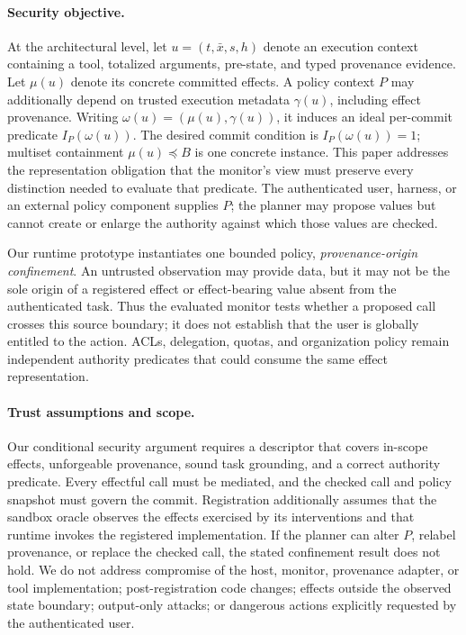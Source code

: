\documentclass[letterpaper,twocolumn,10pt]{article}
\theoremstyle{definition}
\begin{document}
\paragraph{Security objective.}
At the architectural level, let $u=(t,\bar{x},s,h)$ denote an execution context
containing a tool, totalized arguments, pre-state, and typed provenance evidence.
Let $\mu(u)$ denote its concrete committed effects.  A policy context $P$
may additionally depend on trusted execution metadata $\gamma(u)$, including
effect provenance.  Writing $\omega(u)=(\mu(u),\gamma(u))$, it induces an ideal
per-commit predicate $I_P(\omega(u))$.  The desired commit condition is
$I_P(\omega(u))=1$; multiset containment $\mu(u)\preceq B$ is one
concrete instance.  This paper addresses the representation obligation that
the monitor's view must preserve every distinction needed to evaluate that
predicate.  The authenticated user, harness, or an external policy component
supplies $P$; the planner may propose values but cannot create or enlarge the
authority against which those values are checked.

Our runtime prototype instantiates one bounded policy, \emph{provenance-origin
confinement}.  An untrusted observation may provide data, but it may not be the
sole origin of a registered effect or effect-bearing value absent from the
authenticated task.  Thus the evaluated monitor tests whether a proposed call crosses this source
boundary; it does not establish that the user is globally entitled to the
action.  ACLs, delegation, quotas, and organization policy remain independent
authority predicates that could consume the same effect representation.

\paragraph{Trust assumptions and scope.}
Our conditional security argument requires a descriptor that covers in-scope
effects, unforgeable provenance, sound task grounding, and a correct authority
predicate.  Every effectful call must be mediated, and the checked call and
policy snapshot must govern the commit.  Registration additionally assumes
that the sandbox oracle observes the effects exercised by its interventions
and that runtime invokes the registered implementation.
If the planner can alter $P$, relabel provenance, or replace the checked call,
the stated confinement result does not hold.
We do not address compromise of the host, monitor, provenance adapter, or tool
implementation; post-registration code changes; effects outside the observed
state boundary; output-only attacks; or dangerous actions explicitly requested
by the authenticated user.
\end{document}
